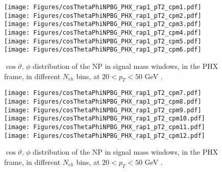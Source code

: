 \documentclass[12pt]{article}
\begin{document}
\begin{figure}[htbp]
\centering
\texttt{[image: Figures/cosThetaPhiNPBG\_PHX\_rap1\_pT2\_cpm1.pdf]}
\texttt{[image: Figures/cosThetaPhiNPBG\_PHX\_rap1\_pT2\_cpm2.pdf]}
\texttt{[image: Figures/cosThetaPhiNPBG\_PHX\_rap1\_pT2\_cpm3.pdf]}
\texttt{[image: Figures/cosThetaPhiNPBG\_PHX\_rap1\_pT2\_cpm4.pdf]}
\texttt{[image: Figures/cosThetaPhiNPBG\_PHX\_rap1\_pT2\_cpm5.pdf]}
\texttt{[image: Figures/cosThetaPhiNPBG\_PHX\_rap1\_pT2\_cpm6.pdf]}
\caption{$\cos\vartheta,\,\phi$ distribution of the NP in signal mass windows, 
	in the PHX frame, in different $N_{ch}$ bins, at $20 < p_{T} < 50$ GeV .}
\end{figure}
\clearpage

\begin{figure}[htbp]
\centering
\texttt{[image: Figures/cosThetaPhiNPBG\_PHX\_rap1\_pT2\_cpm7.pdf]}
\texttt{[image: Figures/cosThetaPhiNPBG\_PHX\_rap1\_pT2\_cpm8.pdf]}
\texttt{[image: Figures/cosThetaPhiNPBG\_PHX\_rap1\_pT2\_cpm9.pdf]}
\texttt{[image: Figures/cosThetaPhiNPBG\_PHX\_rap1\_pT2\_cpm10.pdf]}
\texttt{[image: Figures/cosThetaPhiNPBG\_PHX\_rap1\_pT2\_cpm11.pdf]}
\texttt{[image: Figures/cosThetaPhiNPBG\_PHX\_rap1\_pT2\_cpm12.pdf]}
\caption{$\cos\vartheta,\,\phi$ distribution of the NP in signal mass windows, 
	in the PHX frame, in different $N_{ch}$ bins, at $20 < p_{T} < 50$ GeV .}
\end{figure}
\clearpage
\end{document}

